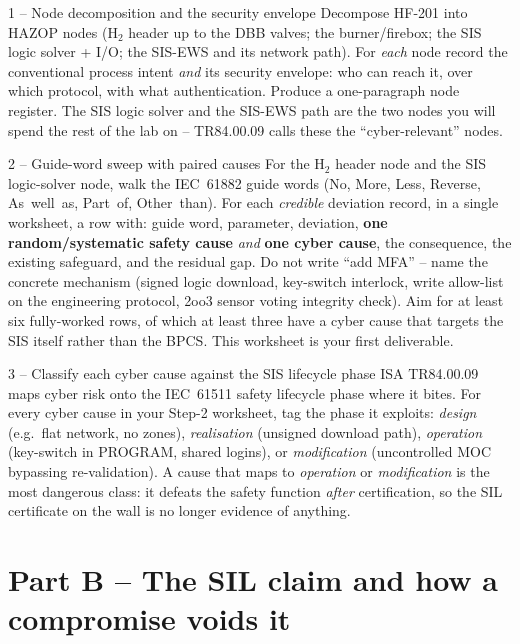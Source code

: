 \documentclass[11pt,a4paper]{article}
\begin{document}
\begin{stepbox}{1 -- Node decomposition and the security envelope}
Decompose HF-201 into HAZOP nodes (H$_2$ header up to the DBB valves; the
burner/firebox; the SIS logic solver + I/O; the SIS-EWS and its network
path). For \emph{each} node record the conventional process intent
\emph{and} its security envelope: who can reach it, over which protocol, with
what authentication. Produce a one-paragraph node register. The SIS logic
solver and the SIS-EWS path are the two nodes you will spend the rest of the
lab on -- TR84.00.09 calls these the ``cyber-relevant'' nodes.
\end{stepbox}

\begin{stepbox}{2 -- Guide-word sweep with paired causes}
For the H$_2$ header node and the SIS logic-solver node, walk the IEC~61882
guide words (No, More, Less, Reverse, As~well~as, Part~of, Other~than).
For each \emph{credible} deviation record, in a single worksheet, a row with:
guide word, parameter, deviation, \textbf{one random/systematic safety cause}
\emph{and} \textbf{one cyber cause}, the consequence, the existing safeguard,
and the residual gap. Do not write ``add MFA'' -- name the concrete mechanism
(signed logic download, key-switch interlock, write allow-list on the
engineering protocol, 2oo3 sensor voting integrity check). Aim for at least
six fully-worked rows, of which at least three have a cyber cause that targets
the SIS itself rather than the BPCS. This worksheet is your first deliverable.
\end{stepbox}

\begin{stepbox}{3 -- Classify each cyber cause against the SIS lifecycle phase}
ISA TR84.00.09 maps cyber risk onto the IEC~61511 safety lifecycle phase
where it bites. For every cyber cause in your Step-2 worksheet, tag the phase
it exploits: \emph{design} (e.g.\ flat network, no zones), \emph{realisation}
(unsigned download path), \emph{operation} (key-switch in PROGRAM, shared
logins), or \emph{modification} (uncontrolled MOC bypassing re-validation).
A cause that maps to \emph{operation} or \emph{modification} is the most
dangerous class: it defeats the safety function \emph{after} certification,
so the SIL certificate on the wall is no longer evidence of anything.
\end{stepbox}

\section*{Part B -- The SIL claim and how a compromise voids it}
\end{document}
